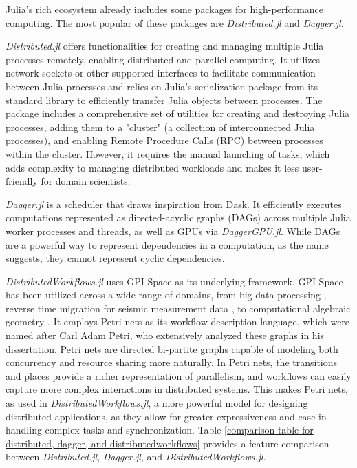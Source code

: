\documentclass{juliacon}
\begin{document}
Julia's rich ecosystem already includes some packages for high-performance computing.
The most popular of these packages are \emph{Distributed.jl}\cite{Distributedjl} and \emph{Dagger.jl}\cite{dagger1, dagger2}.\vskip 6pt

\emph{Distributed.jl} offers functionalities for creating and managing multiple Julia processes remotely, enabling distributed and parallel computing. 
It utilizes network sockets or other supported interfaces to facilitate communication between Julia processes and relies on Julia’s serialization package from its standard library to efficiently transfer Julia objects between processes. 
The package includes a comprehensive set of utilities for creating and destroying Julia processes, adding them to a "cluster" (a collection of interconnected Julia processes), and enabling Remote Procedure Calls (RPC) between processes within the cluster. 
However, it requires the manual launching of tasks, which adds complexity to managing distributed workloads and makes it less user-friendly for domain scientists.\vskip 6pt

\emph{Dagger.jl} is a scheduler that draws inspiration from Dask\cite{dask}. 
It efficiently executes computations represented as directed-acyclic graphs (DAGs) across multiple Julia worker processes and threads, as well as GPUs via \emph{DaggerGPU.jl}. 
While DAGs are a powerful way to represent dependencies in a computation, as the name suggests, they cannot represent cyclic dependencies.\vskip 6pt

\emph{DistributedWorkflows.jl} uses GPI-Space\cite{GSPC} as its underlying framework.
GPI-Space has been utilized across a wide range of domains, from big-data processing \cite{gpispace_paper_mapreduce}, reverse time migration for seismic measurement data \cite{gpispace_paper_seismic}, to computational algebraic geometry \cite{gpispace_paper_singular}.
It employs Petri nets as its workflow description language, which were named after Carl Adam Petri, who extensively analyzed these graphs in his dissertation\cite{petri_nets}.
Petri nets are directed bi-partite graphs capable of modeling both concurrency and resource sharing more naturally.
In Petri nets, the transitions and places provide a richer representation of parallelism, and workflows can easily capture more complex interactions in distributed systems. 
This makes Petri nets, as used in \emph{DistributedWorkflows.jl}, a more powerful model for designing distributed applications, as they allow for greater expressiveness and ease in handling complex tasks and synchronization.
Table \ref{comparison table for distributed, dagger, and distributedworkflows} provides a feature comparison between \emph{Distributed.jl}, \emph{Dagger.jl}, and \emph{DistributedWorkflows.jl}.\vskip 6pt
\end{document}
